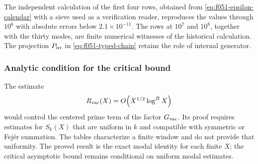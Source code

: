 The independent calculation of the first four rows, obtained from
\eqref{eq:f051-epsilon-calendar} with a sieve used as a verification
reader, reproduces the values through \(10^6\) with absolute errors below
\(2.1\times10^{-11}\). The rows at \(10^7\) and \(10^8\), together with
the thirty modes, are finite numerical witnesses of the historical
calculation. The projection \(P_{\rm irr}\) in
\eqref{eq:f051-typed-chain} retains the role of internal generator.

\subsubsection{Analytic condition for the critical bound}

The estimate
\begin{equation}
 R_{\rm vac}(X)=O\!\left(X^{1/2}\log^B X\right)
 \label{eq:f051-conditional-bound}
\end{equation}
would control the centered prime term of the factor \(G_{\rm vac}\). Its
proof requires estimates for \(S_k(X)\) that are uniform in \(k\) and
compatible with symmetric or Fej\'er summation. The tables characterize a
finite window and do not provide that uniformity. The proved result is the
exact modal identity for each finite \(X\); the critical asymptotic bound
remains conditional on uniform modal estimates.

